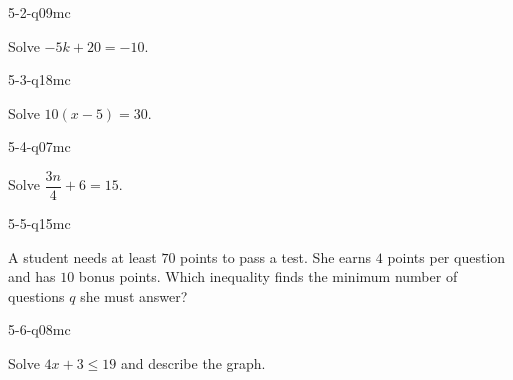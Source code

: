 \begin{practiceQuestion}{5-2-q09}{mc}
\begin{questionText}
Solve $-5k + 20 = -10$.
\end{questionText}
\end{practiceQuestion}

\begin{practiceQuestion}{5-3-q18}{mc}
\begin{questionText}
Solve $10(x - 5) = 30$.
\end{questionText}
\end{practiceQuestion}

\begin{practiceQuestion}{5-4-q07}{mc}
\begin{questionText}
Solve $\dfrac{3n}{4} + 6 = 15$.
\end{questionText}
\end{practiceQuestion}

\begin{practiceQuestion}{5-5-q15}{mc}
\begin{questionText}
A student needs at least $70$ points to pass a test. She earns $4$ points per question and has $10$ bonus points. Which inequality finds the minimum number of questions $q$ she must answer?
\end{questionText}
\end{practiceQuestion}

\begin{practiceQuestion}{5-6-q08}{mc}
\begin{questionText}
Solve $4x + 3 \leq 19$ and describe the graph.
\end{questionText}
\end{practiceQuestion}

